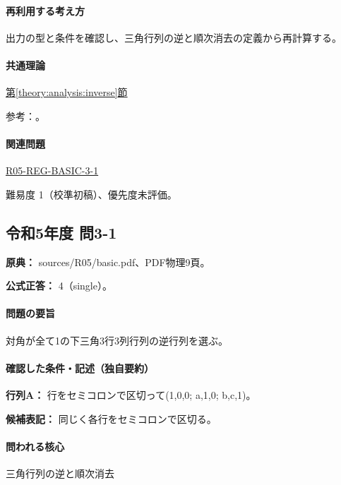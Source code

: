 \paragraph{再利用する考え方} 出力の型と条件を確認し、三角行列の逆と順次消去の定義から再計算する。

\paragraph{共通理論} \hyperref[theory:analysis:inverse]{第\ref*{theory:analysis:inverse}節}

\par 参考：\cite{mit_inverse2007}。

\paragraph{関連問題} \hyperref[q:r05-reg-basic-3-1]{R05-REG-BASIC-3-1}

\par 難易度 1（校準初稿）、優先度未評価。

\subsection{令和5年度 問3-1}
\label{q:r05-reg-basic-3-1}

\noindent\textbf{原典：} sources/R05/basic.pdf、PDF物理9頁。

\textbf{公式正答：} 4（single）。

\paragraph{問題の要旨} 対角が全て1の下三角3行3列行列の逆行列を選ぶ。

\paragraph{確認した条件・記述（独自要約）}\mbox{}\par

\noindent\textbf{行列A：} 行をセミコロンで区切って(1,0,0; a,1,0; b,c,1)。\par

\noindent\textbf{候補表記：} 同じく各行をセミコロンで区切る。\par

\paragraph{問われる核心} 三角行列の逆と順次消去


